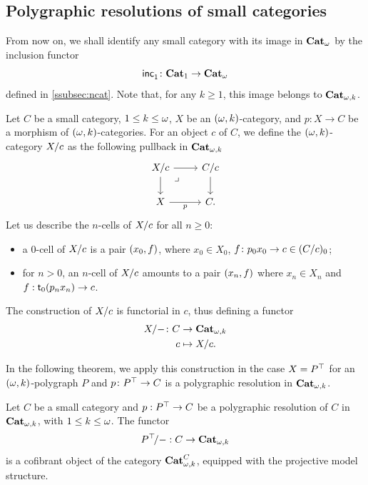 \subsection{Polygraphic resolutions of small categories}\label{subsec:polres}

From now on, we shall identify any small category with its image
in $\mathbf{Cat}_{\omega}$ by the inclusion functor \[\mathsf{inc}_{1}^{}\colon\mathbf{Cat}_{1}\to \mathbf{Cat}_{\omega}\]
defined in \ref{ssubsec:ncat}. Note that, for any $k\geq 1$, this
image belongs to $\mathbf{Cat}_{\omega,k}$. 
\begin{paragr}\label{paragr:pullback_resol}
  Let $C$ be a small category, $1\leq k \leq \omega$, $X$ be an $(\omega,k)$\nbd-category, and $p \colon X \to C$ be a morphism of $(\omega,k)$\nbd-categories. For an object $c$ of $C$, we define the $(\omega,k)$\nbd-category $X/c$ as the following pullback in $\mathbf{Cat}_{\omega,k}$
  \begin{equation}
  \label{eq:pullback}
  \begin{tikzcd}
      \tr{X}{c} \ar[d] \ar[r] & \tr{C}{c} \ar[d] \\
       X \ar[r,"p"'] & C.
      \ar[from=1-1,to=2-2,phantom,"\lrcorner",very near start]
    \end{tikzcd}
  \end{equation} 
  Let us describe the $n$-cells of $X/c$
  for all $n\geq 0$:
  \begin{itemize}
  \item a $0$-cell of $X/c$ is a pair $(x_0,f)$,
    where $x_0\in X_0$, $f\colon p_0x_0\to c\in (C/c)_0$;
  \item for $n>0$, an $n$-cell of $X/c$ amounts to a
    pair $(x_n,f)$ where  $x_n\in X_n$ and $f:\mathsf{t}_{0}
    (p_nx_n)\to c$.
  \end{itemize}
The construction of $X/c$ is functorial in $c$, thus defining a functor
  \[
    \begin{aligned}
      X/- \colon C &\to \mathbf{Cat}_{\omega,k} \\
      c &\mapsto X/c.
    \end{aligned}
  \]
\end{paragr}
In the following theorem, we apply this construction in the case
$X=P^\top$ for an $(\omega,k)$-polygraph $P$ and $p \colon P^\top \to C$
is a polygraphic resolution in $\mathbf{Cat}_{\omega,k}$.
\begin{theorem}\label{thm:projresol}
    Let $C$ be a small category and $p:P^\top\to C$ be a polygraphic
    resolution of $C$ in $\mathbf{Cat}_{\omega,k}$, with $1\leq k\leq\omega$. The functor
    \[P^\top\!/-:C\to \mathbf{Cat}_{\omega,k}\]
    is a cofibrant object of the category $\mathbf{Cat}_{\omega,k}^{C}$, equipped with the projective model structure.
\end{theorem}
